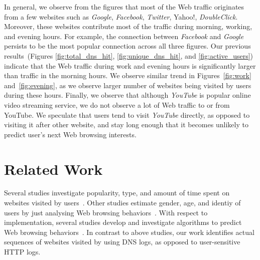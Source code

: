 \documentclass[letterpaper,twocolumn]{article}
\begin{document}
In general, we observe from the figures that most of the Web traffic originates from a few websites such as \textit{Google}, \textit{Facebook}, \textit{Twitter}, Yahoo!, \textit{DoubleClick}.
Moreover, these websites contribute most of the traffic during morning, working, and evening hours. 
For example, the connection between \textit{Facebook} and \textit{Google} persists to be the most popular connection across all three figures. 
Our previous results~(Figures \ref{fig:total_dns_hit}, \ref{fig:unique_dns_hit}, and \ref{fig:active_users}) indicate that the Web traffic during work and evening hours is significantly larger than traffic in the morning hours.
We observe similar trend in Figures~\ref{fig:work} and~\ref{fig:evening}, as we observe larger number of websites being visited by users during these hours.
Finally, we observe that although \textit{YouTube} is popular online video streaming service, we do not observe a lot of Web traffic to or from YouTube.
We speculate that users tend to visit \textit{YouTube} directly, as opposed to visiting it after other website, and stay long enough that it becomes unlikely to predict user's next Web browsing interests. 








\vspace{-15pt}
\section{Related Work}
\label{sec:related_work}
\vspace{-8pt}

Several studies investigate popularity, type, and amount of time spent on websites visited by users~\cite{BighamCBWL07,export:176481,Huang:2010:PBB:1810617.1810622,montgomery2000trends}.
Other studies estimate gender, age, and identiy of users by just analysing Web browsing behaviors~\cite{275,canali2014effectiveness,Hu:2007:DPB:1242572.1242594,kakkarweb}.
With respect to implementation, several studies develop and investigate algorithms to predict Web browsing behaviors~\cite{awad2012prediction,dongre2015improved,scott2006nested,shiryayev1992markov,zhu2005behavior}.
In contrast to above studies, our work identifies actual sequences of websites visited by using DNS logs, as opposed to user-sensitive HTTP logs.
\end{document}
